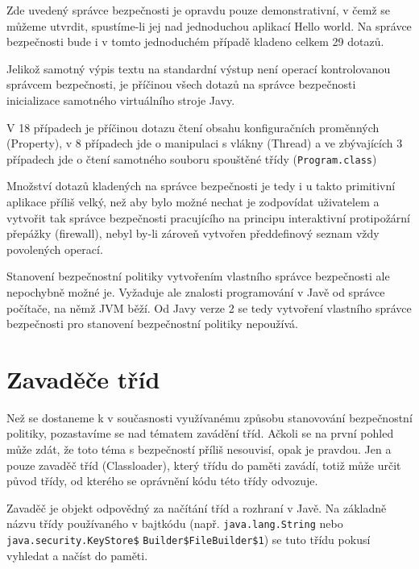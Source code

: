 Zde uvedený správce bezpečnosti je opravdu pouze demonstrativní, v čemž se můžeme utvrdit, spustíme-li jej nad jednoduchou aplikací Hello world. Na správce bezpečnosti bude i v tomto jednoduchém případě kladeno celkem 29 dotazů.

Jelikož samotný výpis textu na standardní výstup není operací kontrolovanou správcem bezpečnosti, je příčinou všech dotazů na správce bezpečnosti inicializace samotného virtuálního stroje Javy.

V 18 případech je příčinou dotazu čtení obsahu konfiguračních proměnných (Property), v 8 případech jde o manipulaci s vlákny (Thread) a ve zbývajících 3 případech jde o čtení samotného souboru spouštěné třídy ({\tt Program.class})

Množství dotazů kladených na správce bezpečnosti je tedy i u takto primitivní aplikace příliš velký, než aby bylo možné nechat je zodpovídat uživatelem a vytvořit tak správce bezpečnosti pracujícího na principu interaktivní protipožární přepážky (firewall), nebyl by-li zároveň vytvořen předdefinový seznam vždy povolených operací.

Stanovení bezpečnostní politiky vytvořením vlastního správce bezpečnosti ale nepochybně možné je. Vyžaduje ale znalosti programování v Javě od správce počítače, na němž JVM běží. Od Javy verze 2 se tedy vytvoření vlastního správce bezpečnosti pro stanovení bezpečnostní politiky nepoužívá.

\section{Zavaděče tříd} \label{classloader}

Než se dostaneme k v současnosti využívanému způsobu stanovování bezpečnostní politiky, pozastavíme se nad tématem zavádění tříd.
Ačkoli se na první pohled může zdát, že toto téma s bezpečností příliš nesouvisí, opak je pravdou.
Jen a pouze zavaděč tříd (Classloader), který třídu do paměti zavádí, totiž může určit původ třídy, od kterého se oprávnění kódu této třídy odvozuje.

Zavaděč je objekt odpovědný za načítání tříd a rozhraní v Javě. Na základně názvu třídy používaného v bajtkódu (např. {\tt java.lang.String} nebo {\tt java.security.KeyStore\$} {\tt Builder\$FileBuilder\$1}) se tuto třídu pokusí vyhledat a načíst do paměti. \cite{refClassLoader}

